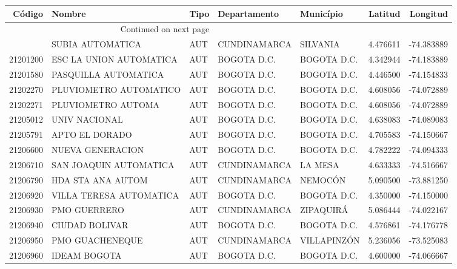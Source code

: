 \begin{longtable}{rllllrr}
\toprule
   Código &                      Nombre & Tipo &     Departamento &         Município &   Latitud &   Longitud \\
\midrule
\endhead
\midrule
\multicolumn{3}{r}{{Continued on next page}} \\
\midrule
\endfoot

\bottomrule
\endlastfoot
 21195160 &            SUBIA AUTOMATICA &  AUT &     CUNDINAMARCA &          SILVANIA &  4.476611 & -74.383889 \\
 21201200 &     ESC LA UNION AUTOMATICA &  AUT &      BOGOTA D.C. &       BOGOTA D.C. &  4.342944 & -74.183889 \\
 21201580 &        PASQUILLA AUTOMATICA &  AUT &      BOGOTA D.C. &       BOGOTA D.C. &  4.446500 & -74.154833 \\
 21202270 &      PLUVIOMETRO AUTOMATICO &  AUT &      BOGOTA D.C. &       BOGOTA D.C. &  4.608056 & -74.072889 \\
 21202271 &          PLUVIOMETRO AUTOMA &  AUT &      BOGOTA D.C. &       BOGOTA D.C. &  4.608056 & -74.072889 \\
 21205012 &               UNIV NACIONAL &  AUT &      BOGOTA D.C. &       BOGOTA D.C. &  4.638083 & -74.089083 \\
 21205791 &              APTO EL DORADO &  AUT &      BOGOTA D.C. &       BOGOTA D.C. &  4.705583 & -74.150667 \\
 21206600 &            NUEVA GENERACION &  AUT &      BOGOTA D.C. &       BOGOTA D.C. &  4.782222 & -74.094333 \\
 21206710 &      SAN JOAQUIN AUTOMATICA &  AUT &     CUNDINAMARCA &           LA MESA &  4.633333 & -74.516667 \\
 21206790 &           HDA STA ANA AUTOM &  AUT &     CUNDINAMARCA &           NEMOCÓN &  5.090500 & -73.881250 \\
 21206920 &     VILLA TERESA AUTOMATICA &  AUT &      BOGOTA D.C. &       BOGOTA D.C. &  4.350000 & -74.150000 \\
 21206930 &                PMO GUERRERO &  AUT &     CUNDINAMARCA &         ZIPAQUIRÁ &  5.086444 & -74.022167 \\
 21206940 &              CIUDAD BOLIVAR &  AUT &      BOGOTA D.C. &       BOGOTA D.C. &  4.576861 & -74.176778 \\
 21206950 &             PMO GUACHENEQUE &  AUT &     CUNDINAMARCA &       VILLAPINZÓN &  5.236056 & -73.525083 \\
 21206960 &                IDEAM BOGOTA &  AUT &      BOGOTA D.C. &       BOGOTA D.C. &  4.600000 & -74.066667 \\

\end{longtable}
